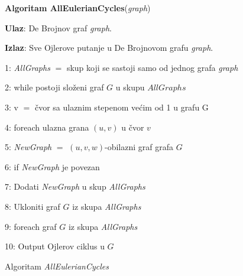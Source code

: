 \documentclass[12pt,oneside]{memoir}
\begin{document}
\begin{figure}[!ht]
\begin{tcolorbox}
\textbf{Algoritam AllEulerianCycles}(\textit{graph})

\textbf{Ulaz}:  De Brojnov graf \textit{graph}.

\textbf{Izlaz}: Sve Ojlerove putanje u De Brojnovom grafu \textit{graph}.

1: \textit{AllGraphs} $=$ skup koji se sastoji samo od jednog grafa \textit{graph}

2: while postoji složeni graf $G$ u skupu $AllGraphs$

3:\hspace{1cm} v $=$ čvor sa ulaznim stepenom većim od 1 u grafu G

4:\hspace{1cm} foreach ulazna grana $(u, v)$ u čvor $v$
    
5:\hspace{2cm} \textit{NewGraph} $=$ $(u, v, w)$-obilazni graf grafa $G$

6:\hspace{2cm} if \textit{NewGraph} je povezan

7:\hspace{3cm} Dodati \textit{NewGraph} u skup \textit{AllGraphs}

8:\hspace{1cm} Ukloniti graf $G$ iz skupa \textit{AllGraphs}

9: foreach graf $G$ iz skupa \textit{AllGraphs}

10:\hspace{1cm} Output Ojlerov ciklus u $G$
\end{tcolorbox}
\caption{Algoritam \textit{AllEulerianCycles} \cite{bioinformaticsAlg}}
\label{box:allEulerianCycles}
\end{figure}
\end{document}
